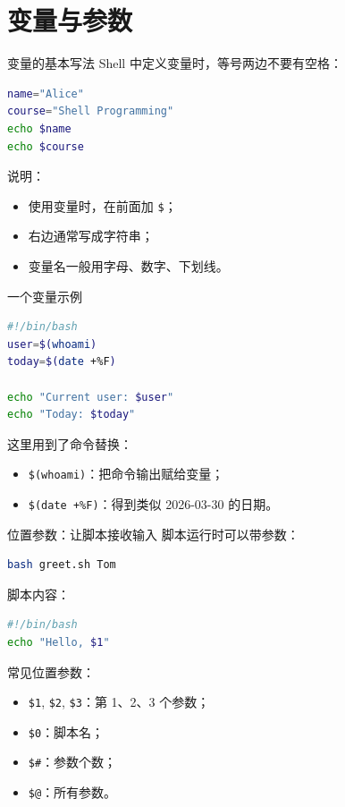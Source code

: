 \documentclass[aspectratio=169]{beamer}
\begin{document}
\section{变量与参数}

\begin{frame}[fragile]{变量的基本写法}
Shell 中定义变量时，等号两边不要有空格：

\begin{lstlisting}[language=bash]
name="Alice"
course="Shell Programming"
echo $name
echo $course
\end{lstlisting}

说明：
\begin{itemize}
  \item 使用变量时，在前面加 \texttt{\$}；
  \item 右边通常写成字符串；
  \item 变量名一般用字母、数字、下划线。
\end{itemize}
\end{frame}

\begin{frame}[fragile]{一个变量示例}
\begin{lstlisting}[language=bash]
#!/bin/bash
user=$(whoami)
today=$(date +%F)

echo "Current user: $user"
echo "Today: $today"
\end{lstlisting}

这里用到了命令替换：
\begin{itemize}
  \item \texttt{\$(whoami)}：把命令输出赋给变量；
  \item \texttt{\$(date +\%F)}：得到类似 2026-03-30 的日期。
\end{itemize}
\end{frame}

\begin{frame}[fragile]{位置参数：让脚本接收输入}
脚本运行时可以带参数：

\begin{lstlisting}[language=bash]
bash greet.sh Tom
\end{lstlisting}

脚本内容：
\begin{lstlisting}[language=bash]
#!/bin/bash
echo "Hello, $1"
\end{lstlisting}

常见位置参数：
\begin{itemize}
  \item \texttt{\$1}, \texttt{\$2}, \texttt{\$3}：第 1、2、3 个参数；
  \item \texttt{\$0}：脚本名；
  \item \texttt{\$\#}：参数个数；
  \item \texttt{\$@}：所有参数。
\end{itemize}
\end{frame}
\end{document}

